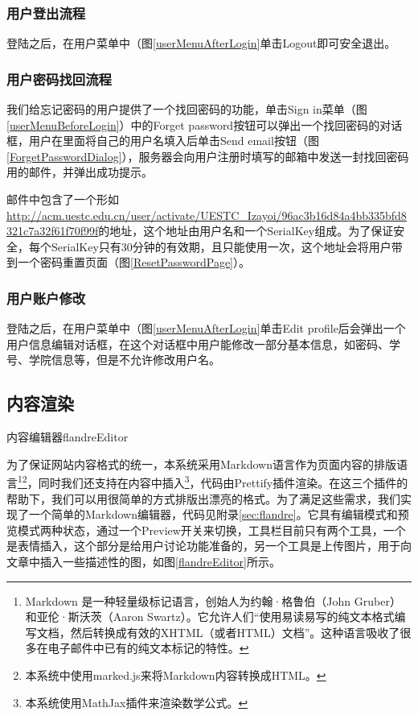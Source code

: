 \subsubsection{用户登出流程}
登陆之后，在用户菜单中（图\ref{userMenuAfterLogin}单击Logout即可安全退出。

\subsubsection{用户密码找回流程}
我们给忘记密码的用户提供了一个找回密码的功能，单击Sign in菜单（图\ref{userMenuBeforeLogin}）中的Forget password按钮可以弹出一个找回密码的对话框，用户在里面将自己的用户名填入后单击Send email按钮（图\ref{ForgetPasswordDialog}），服务器会向用户注册时填写的邮箱中发送一封找回密码用的邮件，并弹出成功提示。


邮件中包含了一个形如\url{http://acm.uestc.edu.cn/user/activate/UESTC_Izayoi/96ac3b16d84a4bb335bfd8321c7a32f61f70f99f}的地址，这个地址由用户名和一个SerialKey组成。为了保证安全，每个SerialKey只有30分钟的有效期，且只能使用一次，这个地址会将用户带到一个密码重置页面（图\ref{ResetPasswordPage}）。


\subsubsection{用户账户修改}
登陆之后，在用户菜单中（图\ref{userMenuAfterLogin}单击Edit profile后会弹出一个用户信息编辑对话框，在这个对话框中用户能修改一部分基本信息，如密码、学号、学院信息等，但是不允许修改用户名。

\subsection{内容渲染}
\begin{pics}[htbp]{内容编辑器}{flandreEditor}
\end{pics}
为了保证网站内容格式的统一，本系统采用Markdown语言作为页面内容的排版语言\footnote{Markdown 是一种轻量级标记语言，创始人为约翰·格鲁伯（John Gruber）和亚伦·斯沃茨（Aaron Swartz）。它允许人们``使用易读易写的纯文本格式编写文档，然后转换成有效的XHTML（或者HTML）文档''。这种语言吸收了很多在电子邮件中已有的纯文本标记的特性。}\footnote{本系统中使用marked.js来将Markdown内容转换成HTML。}，同时我们还支持在内容中插入\footnote{本系统使用MathJax插件来渲染数学公式。}，代码由Prettify插件渲染。在这三个插件的帮助下，我们可以用很简单的方式排版出漂亮的格式。为了满足这些需求，我们实现了一个简单的Markdown编辑器，代码见附录\ref{sec:flandre}。它具有编辑模式和预览模式两种状态，通过一个Preview开关来切换，工具栏目前只有两个工具，一个是表情插入，这个部分是给用户讨论功能准备的，另一个工具是上传图片，用于向文章中插入一些描述性的图，如图\ref{flandreEditor}所示。

